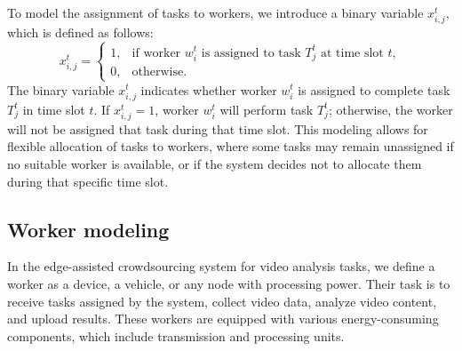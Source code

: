 To model the assignment of tasks to workers, we introduce a binary variable \( x_{i,j}^t \), which is defined as follows:
\[
x_{i,j}^t = 
\begin{cases} 
1, & \text{if worker } w_i^t \text{ is assigned to task } T_j^t \text{ at time slot } t, \\
0, & \text{otherwise}.
\end{cases}
\]
The binary variable \( x_{i,j}^t \) indicates whether worker \( w_i^t \) is assigned to complete task \( T_j^t \) in time slot \( t \). If \( x_{i,j}^t = 1 \), worker \( w_i^t \) will perform task \( T_j^t \); otherwise, the worker will not be assigned that task during that time slot. This modeling allows for flexible allocation of tasks to workers, where some tasks may remain unassigned if no suitable worker is available, or if the system decides not to allocate them during that specific time slot.

\subsection{Worker modeling}
In the edge-assisted crowdsourcing system for video analysis tasks, we define a worker as a device, a vehicle, or any node with processing power. Their task is to receive tasks assigned by the system, collect video data, analyze video content, and upload results. These workers are equipped with various energy-consuming components, which include transmission and processing units. 

